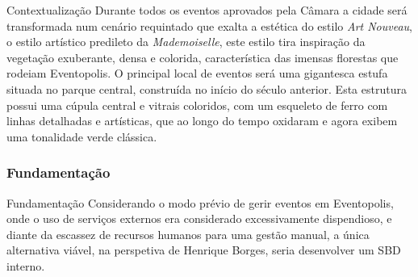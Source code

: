 \documentclass[compress,svgnames,handout,13.7pt]{beamer}
\begin{document}
\begin{frame}{Contextualização}
Durante todos os eventos aprovados pela Câmara a cidade será transformada num cenário requintado que exalta a estética do estilo \textit{Art Nouveau}, o estilo artístico predileto da \textit{Mademoiselle}, este estilo tira inspiração da vegetação exuberante, densa e colorida, característica das imensas florestas que rodeiam Eventopolis. O principal local de eventos será uma gigantesca estufa situada no parque central, construída no início do século anterior. Esta estrutura possui uma cúpula central e vitrais coloridos, com um esqueleto de ferro com linhas detalhadas e artísticas, que ao longo do tempo oxidaram e agora exibem uma tonalidade verde clássica.
\end{frame}

\subsubsection{Fundamentação}
\begin{frame}{Fundamentação}
Considerando o modo prévio de gerir eventos em Eventopolis, onde o uso de serviços externos era considerado excessivamente dispendioso, e diante da escassez de recursos humanos para uma gestão manual, a única alternativa viável, na perspetiva de Henrique Borges, seria desenvolver um SBD interno.
\end{frame}
\end{document}
